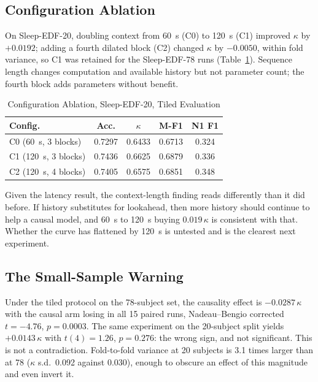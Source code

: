 \documentclass[conference]{IEEEtran}
\begin{document}
\subsection{Configuration Ablation}
\label{sec:config-ablation}

On Sleep-EDF-20, doubling context from 60~s (C0) to 120~s (C1) improved $\kappa$ by $+0.0192$; adding a
fourth dilated block (C2) changed $\kappa$ by $-0.0050$, within fold variance, so C1 was retained for the
Sleep-EDF-78 runs (Table~\ref{tab:config}). Sequence length changes computation and available history but
not parameter count; the fourth block adds parameters without benefit.

\begin{table}[t]
\caption{Configuration Ablation, Sleep-EDF-20, Tiled Evaluation}
\label{tab:config}
\centering
\begin{tabular}{lcccc}
\toprule
Config. & Acc. & $\kappa$ & M-F1 & N1 F1 \\
\midrule
C0 (60~s, 3 blocks)  & 0.7297 & 0.6433 & 0.6713 & 0.324 \\
C1 (120~s, 3 blocks) & 0.7436 & 0.6625 & 0.6879 & 0.336 \\
C2 (120~s, 4 blocks) & 0.7405 & 0.6575 & 0.6851 & 0.348 \\
\bottomrule
\end{tabular}
\end{table}

Given the latency result, the context-length finding reads differently than it did before. If history
substitutes for lookahead, then more history should continue to help a causal model, and 60~s to 120~s
buying $0.019\,\kappa$ is consistent with that. Whether the curve has flattened by 120~s is untested and is
the clearest next experiment.

\subsection{The Small-Sample Warning}

Under the tiled protocol on the 78-subject set, the causality effect is $-0.0287\,\kappa$ with the causal
arm losing in all 15 paired runs, Nadeau--Bengio corrected $t = -4.76$, $p = 0.0003$. The same experiment
on the 20-subject split yields $+0.0143\,\kappa$ with $t(4) = 1.26$, $p = 0.276$: the wrong sign, and not
significant. This is not a contradiction. Fold-to-fold variance at 20 subjects is 3.1 times larger than at
78 ($\kappa$ s.d.\ 0.092 against 0.030), enough to obscure an effect of this magnitude and even invert it.
\end{document}
